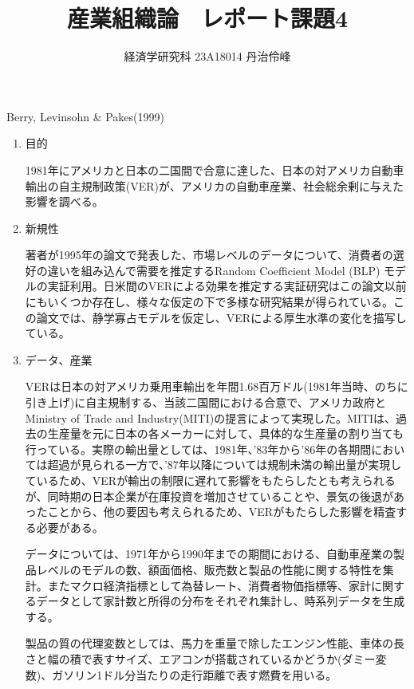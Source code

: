 \documentclass{jsarticle}
\begin{document}
\title{産業組織論　レポート課題4}
\author{経済学研究科 23A18014 丹治伶峰}
\date{}
\maketitle

Berry, Levinsohn \& Pakes(1999)

\begin{enumerate}

\item 目的

1981年にアメリカと日本の二国間で合意に達した、日本の対アメリカ自動車輸出の自主規制政策(VER)が、アメリカの自動車産業、社会総余剰に与えた影響を調べる。

\item 新規性

著者が1995年の論文で発表した、市場レベルのデータについて、消費者の選好の違いを組み込んで需要を推定するRandom Coefficient Model (BLP) モデルの実証利用。日米間のVERによる効果を推定する実証研究はこの論文以前にもいくつか存在し、様々な仮定の下で多様な研究結果が得られている。この論文では、静学寡占モデルを仮定し、VERによる厚生水準の変化を描写している。

\item データ、産業

VERは日本の対アメリカ乗用車輸出を年間1.68百万ドル(1981年当時、のちに引き上げ)に自主規制する、当該二国間における合意で、アメリカ政府とMinistry of Trade and Industry(MITI)の提言によって実現した。MITIは、過去の生産量を元に日本の各メーカーに対して、具体的な生産量の割り当ても行っている。実際の輸出量としては、1981年、'83年から'86年の各期間においては超過が見られる一方で、'87年以降については規制未満の輸出量が実現しているため、VERが輸出の制限に遅れて影響をもたらしたとも考えられるが、同時期の日本企業が在庫投資を増加させていることや、景気の後退があったことから、他の要因も考えられるため、VERがもたらした影響を精査する必要がある。

\vspace{1zw}

データについては、1971年から1990年までの期間における、自動車産業の製品レベルのモデルの数、額面価格、販売数と製品の性能に関する特性を集計。またマクロ経済指標として為替レート、消費者物価指標等、家計に関するデータとして家計数と所得の分布をそれぞれ集計し、時系列データを生成する。

製品の質の代理変数としては、馬力を重量で除したエンジン性能、車体の長さと幅の積で表すサイズ、エアコンが搭載されているかどうか(ダミー変数)、ガソリン1ドル分当たりの走行距離で表す燃費を用いる。


\end{enumerate}
\end{document}
